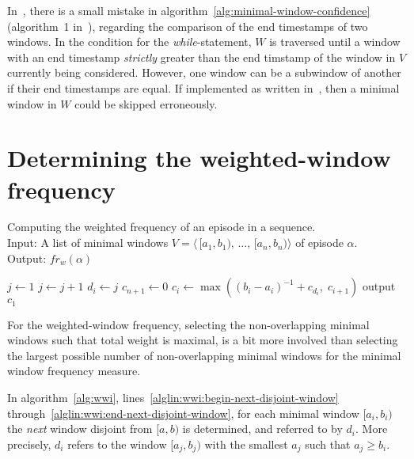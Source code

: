 In~\citep{cule2014marbles}, there is a small mistake in algorithm~\ref{alg:minimal-window-confidence} (algorithm~1 in~\citep{cule2014marbles}), regarding the comparison of the end timestamps of two windows. In the condition for the \emph{while}-statement, $ W $ is traversed until a window with an end timestamp \emph{strictly} greater than the end timstamp of the window in $ V $ currently being considered. However, one window can be a subwindow of another if their end timestamps are equal. If implemented as written in~\cite{cule2014marbles}, then a minimal window in $ W $ could be skipped erroneously.



\section{Determining the weighted-window frequency}

\begin{algorithm}

\caption{Computing the weighted frequency of an episode in a sequence.\\
Input: A list of minimal windows $ V = \langle \, [a_1, b_1), \, \ldots, \, [a_n, b_n) \rangle $ of episode $ \alpha $.\\
Output: $ fr_w(\alpha) $
}

\begin{algorithmic}[1]

\State $ j \gets 1 $
\ForAll {$ [a_i, b_i) \in V $} \label{alglin:wwi:begin-next-disjoint-window}
        \State $ j \gets j + 1 $
    \EndWhile
    \State $ d_i \gets j $ \label{alglin:wwi:end-next-disjoint-window}
\EndFor
\State $ c_{n + 1} \gets 0 $ \label{alglin:wwi:begin-wwi-calculation}
    \State $ c_i \gets \max((b_i - a_i)^{-1} + c_{d_i}, \; c_{i+1}) $ \label{alglin:wwi:end-wwi-calculation}
\EndFor
\State output $ c_1 $

\end{algorithmic}

\label{alg:wwi}
\end{algorithm}

For the weighted-window frequency, selecting the non-overlapping minimal windows such that total weight is maximal, is a bit more involved than selecting the largest possible number of non-overlapping minimal windows for the minimal window frequency measure.

In algorithm~\ref{alg:wwi}, lines~\ref{alglin:wwi:begin-next-disjoint-window} through~\ref{alglin:wwi:end-next-disjoint-window}, for each minimal window $ [a_i, b_i) $ the \emph{next} window disjoint from $ [a, b) $ is determined, and referred to by $ d_i $. More precisely, $ d_i $ refers to the window $ [a_j, b_j) $ with the smallest $ a_j $ such that $ a_j \geq b_i $.

